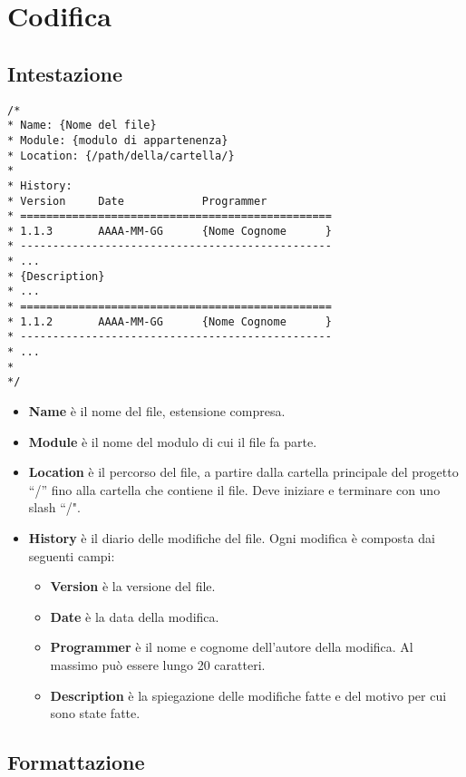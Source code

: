 \section{Codifica}

\subsection{Intestazione}

\begin{lstlisting}
/*
* Name: {Nome del file}
* Module: {modulo di appartenenza}
* Location: {/path/della/cartella/}
*
* History:
* Version     Date            Programmer    
* ================================================
* 1.1.3       AAAA-MM-GG      {Nome Cognome      }
* ------------------------------------------------
* ...
* {Description}
* ...
* ================================================
* 1.1.2       AAAA-MM-GG      {Nome Cognome      }
* ------------------------------------------------
* ...
*
*/
\end{lstlisting}

\begin{itemize}
 \item \textbf{Name} è il nome del file, estensione compresa.
 \item \textbf{Module} è il nome del modulo di cui il file fa parte.
 \item \textbf{Location} è il percorso del file, a partire dalla cartella principale del progetto ``/'' fino alla cartella che contiene il file. Deve iniziare e terminare con uno slash ``/".
 \item \textbf{History} è il diario delle modifiche del file. Ogni modifica è composta dai seguenti campi:
 
	\begin{itemize}
	 \item \textbf{Version} è la versione del file.
	 \item \textbf{Date} è la data della modifica.
	 \item \textbf{Programmer} è il nome e cognome dell'autore della modifica. Al massimo può essere lungo 20 caratteri.
	 \item \textbf{Description} è la spiegazione delle modifiche fatte e del motivo per cui sono state fatte.	 
	\end{itemize}
\end{itemize}

\subsection{Formattazione}

